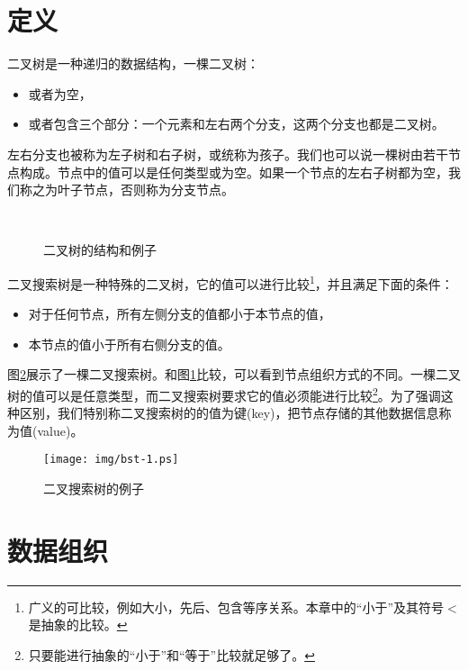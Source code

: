 \documentclass[b5paper]{ctexart}
\begin{document}
\section{定义}
\label{introduction} 

二叉树是一种递归的数据结构，一棵二叉树：

\begin{itemize}
\item 或者为空，
\item 或者包含三个部分：一个元素和左右两个分支，这两个分支也都是二叉树。
\end{itemize}

左右分支也被称为左子树和右子树，或统称为孩子。我们也可以说一棵树由若干节点构成。节点中的值可以是任何类型或为空。如果一个节点的左右子树都为空，我们称之为叶子节点，否则称为分支节点。

\begin{figure}[htbp]
  \centering
   \\
  \caption{二叉树的结构和例子}
  \label{fig:binary-tree-example}
\end{figure}

二叉搜索树是一种特殊的二叉树，它的值可以进行比较\footnote{广义的可比较，例如大小，先后、包含等序关系。本章中的“小于”及其符号$<$是抽象的比较。}，并且满足下面的条件：
\begin{itemize}
\item 对于任何节点，所有左侧分支的值都小于本节点的值，
\item 本节点的值小于所有右侧分支的值。
\end{itemize}

图\ref{fig:bst-example}展示了一棵二叉搜索树。和图\ref{fig:binary-tree-example}比较，可以看到节点组织方式的不同。一棵二叉树的值可以是任意类型，而二叉搜索树要求它的值必须能进行比较\footnote{只要能进行抽象的“小于”和“等于”比较就足够了。}。为了强调这种区别，我们特别称二叉搜索树的的值为键(key)，把节点存储的其他数据信息称为值(value)。

\begin{figure}[htbp]
  \centering
  \texttt{[image: img/bst-1.ps]}
  \caption{二叉搜索树的例子} \label{fig:bst-example}
\end{figure}


\section{数据组织}
\end{document}
